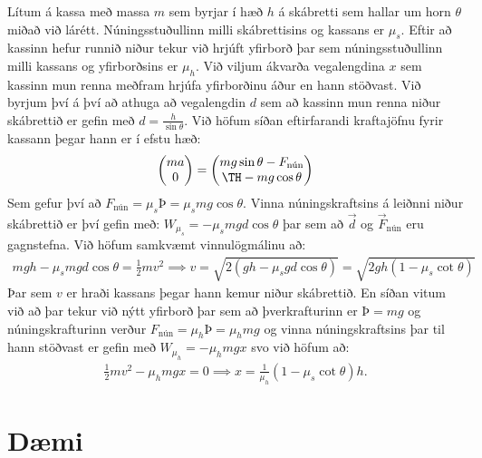 \begin{minipage}{\linewidth}
Lítum á kassa með massa $m$ sem byrjar í hæð $h$ á skábretti sem hallar um horn $\theta$ miðað við lárétt. Núningsstuðullinn milli skábrettisins og kassans er $\mu_s$. Eftir að kassinn hefur runnið niður tekur við hrjúft yfirborð þar sem núningsstuðullinn milli kassans og yfirborðsins er $\mu_h$. Við viljum ákvarða vegalengdina $x$ sem kassinn mun renna meðfram hrjúfa yfirborðinu áður en hann stöðvast. Við byrjum því á því að athuga að vegalengdin $d$ sem að kassinn mun renna niður skábrettið er gefin með $d = \frac{h}{\sin\theta}$. Við höfum síðan eftirfarandi kraftajöfnu fyrir kassann þegar hann er í efstu hæð:
\begin{align*}
    \mqty(ma \\ 0) = \mqty(mg\sin\theta - F_{\text{nún}} \\ Þ - mg\cos\theta)
\end{align*}
Sem gefur því að $F_{\text{nún}} = \mu_s Þ = \mu_s mg\cos\theta$. Vinna núningskraftsins á leiðnni niður skábrettið er því gefin með: $W_{\mu_s} = -\mu_s mgd\cos\theta$ þar sem að $\vec{d}$ og $\vec{F}_{\text{nún}}$ eru gagnstefna. Við höfum samkvæmt vinnulögmálinu að:
\begin{align*}
    mgh - \mu_s mgd\cos\theta = \frac{1}{2}mv^2 \implies v = \sqrt{2\left(gh - \mu_s gd \cos\theta \right)} = \sqrt{2gh\left(1 - \mu_s \cot\theta \right)}
\end{align*}
Þar sem $v$ er hraði kassans þegar hann kemur niður skábrettið. En síðan vitum við að þar tekur við nýtt yfirborð þar sem að þverkrafturinn er $Þ = mg$ og núningskrafturinn verður $F_{\text{nún}} = \mu_h Þ = \mu_h mg$ og vinna núningskraftsins þar til hann stöðvast er gefin með $W_{\mu_h} = -\mu_h mgx$ svo við höfum að:
\begin{align*}
    \frac{1}{2}mv^2 - \mu_h mgx = 0 \implies x = \frac{1}{\mu_h}\left(1- \mu_s \cot\theta \right)h.
\end{align*}


\end{minipage}






\newpage


\section{Dæmi}

